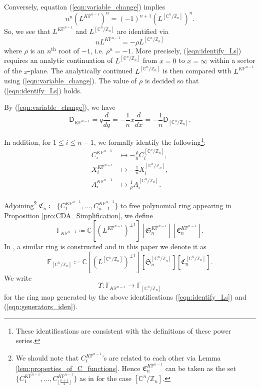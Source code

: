 \documentclass[12pt]{amsart}
\numberwithin{equation}{section}
\newcommand{\CnZn}{[\mathbb{C}^n/\mathbb{Z}_n]}
\newcommand{\KP}{K\mathbb{P}}
\begin{document}
Conversely, equation (\ref{eqn:variable_change}) implies
\begin{equation*}
n^n(L^{\KP^{n-1}})^n={(-1)^{n+1}}(L^{\CnZn})^{n}.
\end{equation*}
So, we see that $L^{\KP^{n-1}}$ and $L^{\CnZn}$ are identified via%
\begin{equation}\label{eqn:identify_Ls}
nL^{\KP^{n-1}}=-{\rho}L^{\CnZn}
\end{equation}
where $\rho$ is an $n^{\text{th}}$ root of $-1$, i.e. $\rho^n=-1$. More precisely, (\ref{eqn:identify_Ls}) requires an analytic continuation of $L^{\CnZn}$ from $x=0$ to $x=\infty$ within a sector of the $x$-plane. The analytically continued $L^{\CnZn}$ is then compared with $L^{\KP^{n-1}}$ using (\ref{eqn:variable_change}). The value of $\rho$ is decided so that (\ref{eqn:identify_Ls}) holds.

By (\ref{eqn:variable_change}), we have
\begin{equation}\label{eqn:D_ident}
\mathsf{D}_{\KP^{n-1}}=q\frac{d}{dq}=-\frac{1}{n}x\frac{d}{dx}=-\frac{1}{n}\mathsf{D}_{\CnZn}.  \end{equation}

In addition, for $1\leq{i}\leq n-1$, we formally identify the following\footnote{These identifications are consistent with the definitions of these power series.}:
\begin{equation}\label{eqn:generators_iden}
\begin{split}
C_i^{\KP^{n-1}}&\mapsto -\frac{\rho}{n}C_i^{\CnZn},\\
X_i^{\KP^{n-1}}&\mapsto -\frac{1}{n}X_i^{\CnZn},\\   
A_i^{\KP^{n-1}}&\mapsto \frac{1}{\rho}A_i^{\CnZn}. \end{split}   
\end{equation}

Adjoining\footnote{We should note that $C^{\KP^{n-1}}_i$'s are related to each other via Lemma \ref{lem:properties_of_C_functions}. Hence $\mathfrak{C}^{\KP^{n-1}}_n$ can be taken as the set $\{C^{\KP^{n-1}}_1,\ldots,C^{\KP^{n-1}}_{\lfloor{\frac{n+1}{2}}\rfloor}\}$ as in \cite{gt} for the case $\CnZn$.} $\mathfrak{C}_n\coloneqq \{C_1^{\KP^{n-1}},\ldots,C_{n-1}^{\KP^{n-1}}\}$ to free polynomial ring appearing in Proposition \ref{pro:CDA_Simplification}, we define
\begin{equation*}
\mathds{F}_{\KP^{n-1}}\coloneqq \mathbb{C}[(L^{\KP^{n-1}})^{\pm{1}}][\mathfrak{S}_n^{\KP^{n-1}}][\mathfrak{C}_n^{\KP^{n-1}}].
\end{equation*}
In \cite[Proposition 2.11, and Corollary 3.4]{gt}, a similar ring is constructed and in this paper we denote it as
\begin{equation*}
\mathds{F}_{\CnZn}\coloneqq \mathbb{C}[(L^{\CnZn})^{\pm{1}}][\mathfrak{S}_n^{\CnZn}][\mathfrak{C}_n^{\CnZn}].
\end{equation*}
We write $$\Upsilon: \mathds{F}_{\KP^{n-1}} \to \mathds{F}_{\CnZn} $$ for the ring map generated by the above identifications (\ref{eqn:identify_Ls}) and (\ref{eqn:generators_iden}).
\end{document}
